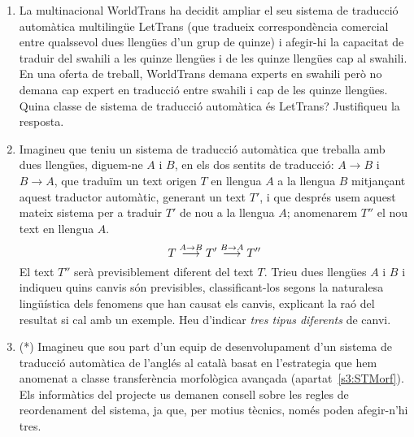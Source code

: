 \begin{enumerate}
\item La multinacional WorldTrans ha decidit ampliar el seu sistema de
  traducció automàtica multilingüe LetTrans (que tradueix
  correspondència comercial entre qualssevol dues llengües d'un grup
  de quinze) i afegir-hi la capacitat de traduir del swahili a les
  quinze llengües i de les quinze llengües cap al swahili. En una
  oferta de treball, WorldTrans demana experts en swahili però no
  demana cap expert en traducció entre swahili i cap de les quinze
  llengües. Quina classe de sistema de traducció automàtica és
  LetTrans?  Justifiqueu la resposta.

\item Imagineu que teniu un sistema de traducció automàtica que
  treballa amb dues llengües, diguem-ne $A$ i $B$, en els dos sentits
  de traducció: $A{\rightarrow}B$ i $B{\rightarrow}A$, que traduïm un
  text origen $T$ en llengua $A$ a la llengua $B$ mitjançant aquest
  traductor automàtic, generant un text $T'$, i que després usem
  aquest mateix sistema per a traduir $T'$ de nou a la llengua $A$;
  anomenarem $T''$ el nou text en llengua $A$.
  \begin{equation}
    T \stackrel{\scriptsize A\rightarrow
      B}{\longrightarrow}T'\stackrel{\scriptsize B\rightarrow
      A}{\longrightarrow} T''
  \end{equation}
  El text $T''$ serà previsiblement diferent del text $T$.  Trieu dues
  llengües $A$ i $B$ i indiqueu quins canvis són previsibles,
  classificant-los segons la naturalesa lingüística dels fenomens que
  han causat els canvis, explicant la raó del resultat si cal amb un
  exemple. Heu d'indicar \emph{tres tipus diferents} de canvi.

\item (*) Imagineu que sou part d'un equip de desenvolupament d'un
  sistema de traducció automàtica de l'anglés al català basat en
  l'estrategia que hem anomenat a classe transferència morfològica
  avançada (apartat~\ref{s3:STMorf}). Els informàtics del projecte us
  demanen consell sobre les regles de reordenament del sistema, ja
  que, per motius tècnics, només poden afegir-n'hi tres.
      

\end{enumerate}
